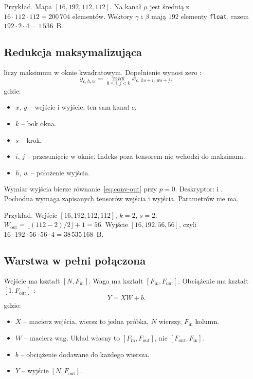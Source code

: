 Przykład. Mapa \([16, 192, 112, 112]\). Na kanał \(\mu\) jest średnią z \(16 \cdot 112 \cdot 112 = 200\,704\) elementów. Wektory \(\gamma\) i \(\beta\) mają \(192\) elementy \texttt{float}, razem \(192 \cdot 2 \cdot 4 = 1\,536\)~B.

\subsection{Redukcja maksymalizująca}

 liczy maksimum w oknie kwadratowym. Dopełnienie wynosi zero \cite{goodfellow2016deep}:
\begin{equation}
\label{eq:pool}
y_{c, h, w}
  = \max_{0 \le i, j < k}
    x_{c,\, hs + i,\, ws + j},
\end{equation}
gdzie:
\begin{itemize}
\item \(x\), \(y\) -- wejście i wyjście, ten sam kanał \(c\).
\item \(k\) -- bok okna.
\item \(s\) -- krok.
\item \(i\), \(j\) -- przesunięcie w oknie. Indeks poza tensorem nie wchodzi do maksimum.
\item \(h\), \(w\) -- położenie wyjścia.
\end{itemize}

Wymiar wyjścia bierze równanie~\eqref{eq:conv-out} przy \(p = 0\). Deskryptor:  i  \cite{nvidia-cudnn}. Pochodna wymaga zapisanych tensorów wejścia i wyjścia. Parametrów nie ma.

Przykład. Wejście \([16, 192, 112, 112]\), \(k = 2\), \(s = 2\). \(W_{\mathrm{out}} = \lfloor (112 - 2) / 2 \rfloor + 1 = 56\). Wyjście \([16, 192, 56, 56]\), czyli \(16 \cdot 192 \cdot 56 \cdot 56 \cdot 4 = 38\,535\,168\)~B.

\subsection{Warstwa w pełni połączona}

Wejście  ma kształt \([N, F_{\mathrm{in}}]\). Waga ma kształt \([F_{\mathrm{in}}, F_{\mathrm{out}}]\). Obciążenie ma kształt \([1, F_{\mathrm{out}}]\) \cite{goodfellow2016deep}:
\begin{equation}
\label{eq:fc}
Y = XW + b.
\end{equation}
gdzie:
\begin{itemize}
\item \(X\) -- macierz wejścia, wiersz to jedna próbka, \(N\) wierszy, \(F_{\mathrm{in}}\) kolumn.
\item \(W\) -- macierz wag. Układ własny to \([F_{\mathrm{in}}, F_{\mathrm{out}}]\), nie \([F_{\mathrm{out}}, F_{\mathrm{in}}]\).
\item \(b\) -- obciążenie dodawane do każdego wiersza.
\item \(Y\) -- wyjście \([N, F_{\mathrm{out}}]\).
\end{itemize}

